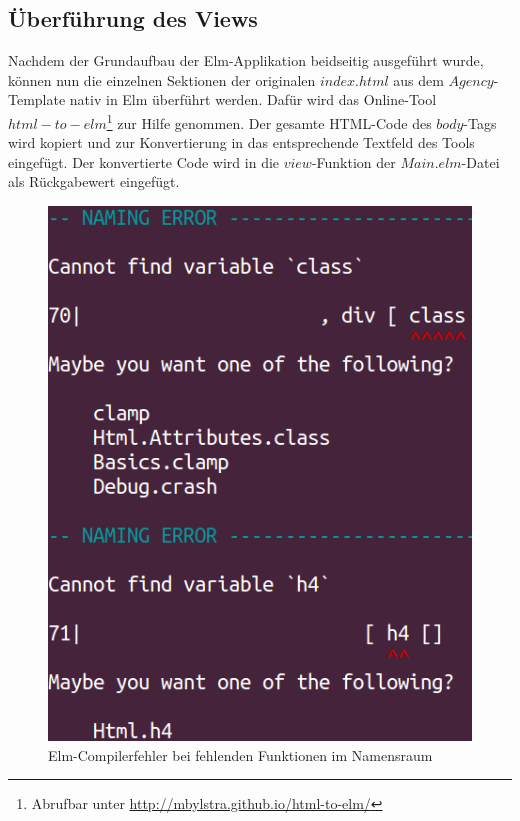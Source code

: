 \subsection{Überführung des Views}
\label{sec:ueberfuehrung-view}
Nachdem der Grundaufbau der Elm-Applikation beidseitig ausgeführt wurde, können nun die einzelnen Sektionen der originalen $index.html$ aus dem $Agency$-Template nativ in Elm überführt werden. Dafür wird das Online-Tool $html-to-elm$\footnote{Abrufbar unter \url{http://mbylstra.github.io/html-to-elm/}} zur Hilfe genommen. Der gesamte \ac{HTML}-Code des $body$-Tags wird kopiert und zur Konvertierung in das entsprechende Textfeld des Tools eingefügt. Der konvertierte Code wird in die $view$-Funktion der $Main.elm$-Datei als Rückgabewert eingefügt.
\begin{figure}[h]
\centering
\includegraphics[scale=0.5]{img/elm-naming-error.png}
\caption{Elm-Compilerfehler bei fehlenden Funktionen im Namensraum}\label{fig:elm-naming-error}
\end{figure}

